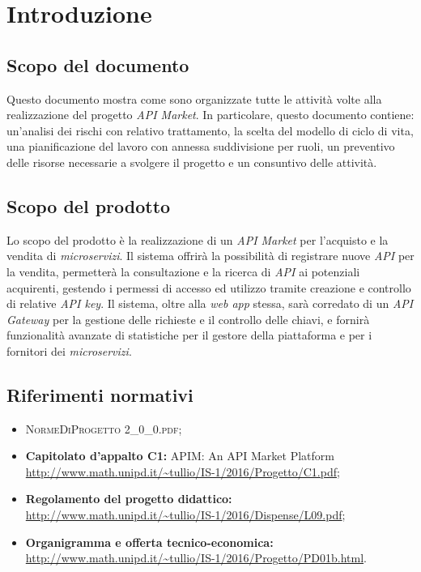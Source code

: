 \newpage
\section{Introduzione}

\subsection{Scopo del documento}
Questo documento mostra come sono organizzate tutte le attività volte alla realizzazione del progetto \textit{API Market}. In particolare, questo documento contiene: un'analisi dei rischi con relativo trattamento, la scelta del modello di ciclo di vita, una pianificazione del lavoro con annessa suddivisione per ruoli, un preventivo delle risorse necessarie a svolgere il progetto e un consuntivo delle attività.

\subsection{Scopo del prodotto}
Lo scopo del prodotto è la realizzazione di un \textit{API Market} per l'acquisto e la vendita di \textit{microservizi}. Il sistema offrirà la possibilità di registrare nuove \textit{API} per la vendita, permetterà la consultazione e la ricerca di \textit{API} ai potenziali acquirenti, gestendo i permessi di accesso ed utilizzo tramite creazione e controllo di relative \textit{API key}. Il sistema, oltre alla \textit{web app} stessa, sarà corredato di un \textit{API Gateway} per la gestione delle richieste e il controllo delle chiavi, e fornirà funzionalità avanzate di statistiche per il gestore della piattaforma e per i fornitori dei \textit{microservizi}.

\subsection{Riferimenti normativi}
\begin{itemize}
\item \textsc{NormeDiProgetto 2\_0\_0.pdf};
\item \textbf{Capitolato d’appalto C1:} APIM: An API Market Platform\\ \url{http://www.math.unipd.it/~tullio/IS-1/2016/Progetto/C1.pdf};
\item \textbf{Regolamento del progetto didattico:}\\
\url{http://www.math.unipd.it/~tullio/IS-1/2016/Dispense/L09.pdf};
\item \textbf{Organigramma e offerta tecnico-economica:}\\
\url{http://www.math.unipd.it/~tullio/IS-1/2016/Progetto/PD01b.html}.
\end{itemize}

